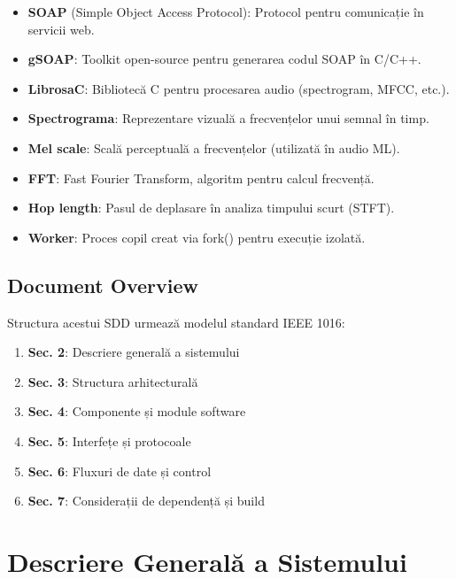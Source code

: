 \documentclass[12pt,a4paper,twoside]{article}
\begin{document}
\begin{itemize}
    \item \textbf{SOAP} (Simple Object Access Protocol): Protocol pentru comunicație
          în servicii web.
    \item \textbf{gSOAP}: Toolkit open-source pentru generarea codul SOAP în C/C++.
    \item \textbf{LibrosaC}: Bibliotecă C pentru procesarea audio (spectrogram, MFCC, etc.).
    \item \textbf{Spectrograma}: Reprezentare vizuală a frecvențelor unui semnal în timp.
    \item \textbf{Mel scale}: Scală perceptuală a frecvențelor (utilizată în audio ML).
    \item \textbf{FFT}: Fast Fourier Transform, algoritm pentru calcul frecvență.
    \item \textbf{Hop length}: Pasul de deplasare în analiza timpului scurt (STFT).
    \item \textbf{Worker}: Proces copil creat via fork() pentru execuție izolată.
\end{itemize}

\subsection{Document Overview}

Structura acestui SDD urmează modelul standard IEEE 1016:

\begin{enumerate}
    \item \textbf{Sec. 2}: Descriere generală a sistemului
    \item \textbf{Sec. 3}: Structura arhitecturală
    \item \textbf{Sec. 4}: Componente și module software
    \item \textbf{Sec. 5}: Interfețe și protocoale
    \item \textbf{Sec. 6}: Fluxuri de date și control
    \item \textbf{Sec. 7}: Considerații de dependență și build
\end{enumerate}

\section{Descriere Generală a Sistemului}
\end{document}
